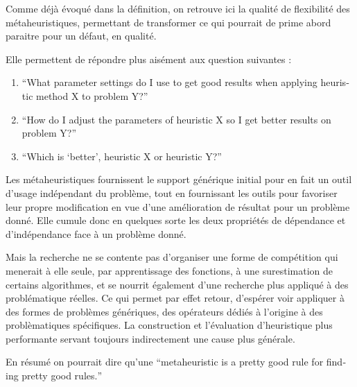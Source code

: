 Comme déjà évoqué dans la définition, on retrouve ici la qualité de flexibilité des métaheuristiques, permettant de transformer ce qui pourrait de prime abord paraitre pour un défaut, en qualité. 

Elle permettent de répondre plus aisément aux question suivantes  : 
\begin{enumerate}
\item  \foreignquote{english}{What parameter settings do I use to get good results when applying heuristic method X to problem Y?}
\item  \foreignquote{english}{How do I adjust the parameters of heuristic X so I get better results on problem Y?}
\item \foreignquote{english}{Which is \enquote{better}, heuristic X or heuristic Y?}
\end{enumerate}

Les métaheuristiques fournissent le support générique initial pour en fait un outil d'usage indépendant du problème, tout en fournissant les outils pour favoriser leur propre modification en vue d'une amélioration de résultat pour un problème donné. Elle cumule donc en quelques sorte les deux propriétés de dépendance et d'indépendance face à un problème donné. 

Mais la recherche ne se contente pas d'organiser une forme de compétition qui menerait à elle seule, par apprentissage des fonctions, à une surestimation de certains algorithmes, et se nourrit également d'une recherche plus appliqué à des problématique réelles. Ce qui permet par effet retour, d'espérer voir appliquer à des formes de problèmes génériques, des opérateurs dédiés à l'origine à des problèmatiques spécifiques. La construction et l'évaluation d'heuristique plus performante servant toujours indirectement une cause plus générale.

En résumé on pourrait dire qu'une \foreignquote{english}{metaheuristic is a pretty good rule for finding pretty good rules.}








